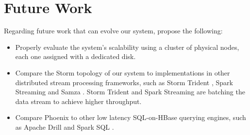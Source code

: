 \section{Future Work}

Regarding future work that can evolve our system, propose the following:
\begin{itemize}
\item Properly evaluate the system's scalability using a cluster of physical nodes, each one assigned with a dedicated disk.
\item Compare the Storm topology of our system to implementations in other distributed stream processing frameworks, such as Storm Trident \cite{trident}, Spark Streaming \cite{spark_streaming} and Samza \cite{samza}. Storm Trident and Spark Streaming are batching the data stream to achieve higher throughput.
\item Compare Phoenix to other low latency SQL-on-HBase querying engines, such as Apache Drill \cite{drill} and Spark SQL \cite{spark_sql}.
\end{itemize}


\cleardoublepage
